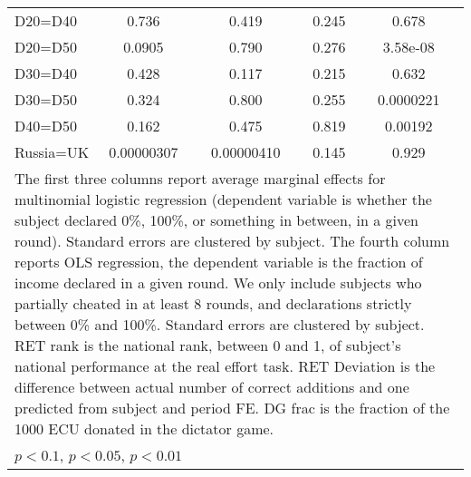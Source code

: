 \begin{tabular}{l|cccccc|cc}
D20=D40         &    0.736         &         &    0.419         &         &    0.245         &         &    0.678         &         \\
D20=D50         &   0.0905         &         &    0.790         &         &    0.276         &         & 3.58e-08         &         \\
D30=D40         &    0.428         &         &    0.117         &         &    0.215         &         &    0.632         &         \\
D30=D50         &    0.324         &         &    0.800         &         &    0.255         &         &0.0000221         &         \\
D40=D50         &    0.162         &         &    0.475         &         &    0.819         &         &  0.00192         &         \\
Russia=UK       &0.00000307         &         &0.00000410         &         &    0.145         &         &    0.929         &         \\
\hline\hline
\multicolumn{9}{p{16cm}}{\tiny The first three columns report average marginal effects for multinomial logistic regression (dependent variable is whether the subject declared 0\%, 100\%, or something in between, in a given round). Standard errors are clustered by subject. The fourth column reports OLS regression, the dependent variable is the fraction of income declared in a given round. We only include subjects who partially cheated in at least 8 rounds, and declarations strictly between 0\% and 100\%. Standard errors are clustered by subject. RET rank is the national rank, between 0 and 1, of subject's national performance at the real effort task. RET Deviation is the difference between actual number of correct additions and one predicted from subject and period FE. DG frac is the fraction of the 1000 ECU donated in the dictator game.}\\
\multicolumn{9}{l}{\tiny \sym{*} \(p<0.1\), \sym{**} \(p<0.05\), \sym{***} \(p<0.01\)}\\
\end{tabular}